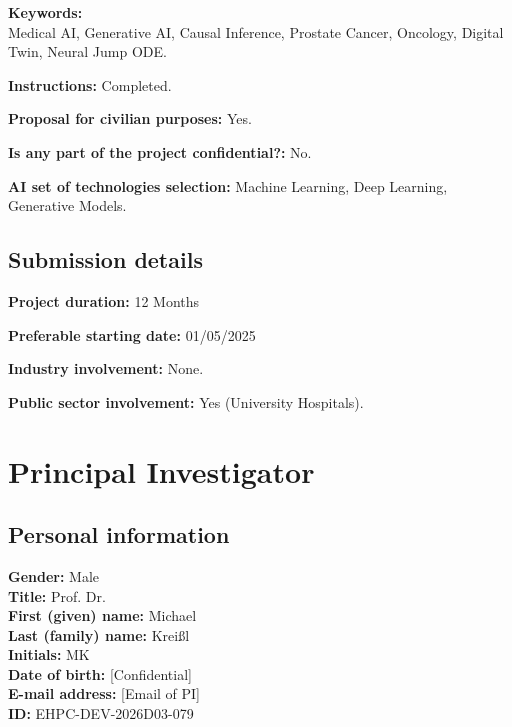\documentclass[11pt, a4paper]{article}
\begin{document}
\vspace{0.5em}
\noindent\textbf{Keywords:} \\
Medical AI, Generative AI, Causal Inference, Prostate Cancer, Oncology, Digital Twin, Neural Jump ODE.

\vspace{0.5em}
\noindent\textbf{Instructions:} Completed.

\vspace{0.5em}
\noindent\textbf{Proposal for civilian purposes:} Yes.

\vspace{0.5em}
\noindent\textbf{Is any part of the project confidential?:} No.

\vspace{0.5em}
\noindent\textbf{AI set of technologies selection:} Machine Learning, Deep Learning, Generative Models.

\subsection*{Submission details}

\noindent\textbf{Project duration:} 12 Months

\vspace{0.5em}
\noindent\textbf{Preferable starting date:} 01/05/2025

\vspace{0.5em}
\noindent\textbf{Industry involvement:} None.

\vspace{0.5em}
\noindent\textbf{Public sector involvement:} Yes (University Hospitals).

\section*{Principal Investigator}

\subsection*{Personal information}

\noindent\textbf{Gender:} Male \\
\textbf{Title:} Prof. Dr. \\
\textbf{First (given) name:} Michael \\
\textbf{Last (family) name:} Kreißl \\
\textbf{Initials:} MK \\
\textbf{Date of birth:} [Confidential] \\
\textbf{E-mail address:} [Email of PI] \\
\textbf{ID:} EHPC-DEV-2026D03-079
\end{document}
